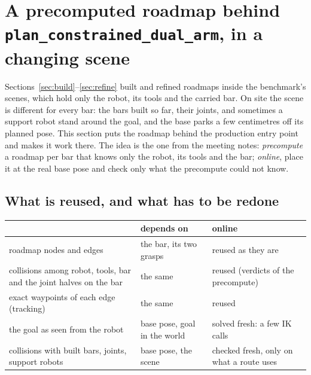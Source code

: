 
\section{A precomputed roadmap behind \texttt{plan\_constrained\_dual\_arm}, in a changing scene}
\label{sec:scene}

Sections~\ref{sec:build}--\ref{sec:refine} built and refined roadmaps inside the
benchmark's scenes, which hold only the robot, its tools and the carried bar. On
site the scene is different for every bar: the bars built so far, their joints,
and sometimes a support robot stand around the goal, and the base parks a few
centimetres off its planned pose. This section puts the roadmap behind the
production entry point and makes it work there. The idea is the one from the
meeting notes: \emph{precompute} a roadmap per bar that knows only the robot, its
tools and the bar; \emph{online}, place it at the real base pose and check only
what the precompute could not know.

\subsection{What is reused, and what has to be redone}

\begin{center}
\footnotesize
\begin{tabular}{@{}p{4.6cm} p{5.0cm} p{5.6cm}@{}}
\toprule
 & depends on & online \\
\midrule
roadmap nodes and edges & the bar, its two grasps & reused as they are \\
collisions among robot, tools, bar and the joint halves on the bar & the same & reused (verdicts of the precompute) \\
exact waypoints of each edge (tracking) & the same & reused \\
the goal as seen from the robot & base pose, goal in the world & solved fresh: a few IK calls \\
collisions with built bars, joints, support robots & base pose, the scene & checked fresh, only on what a route uses \\
\bottomrule
\end{tabular}
\end{center}

